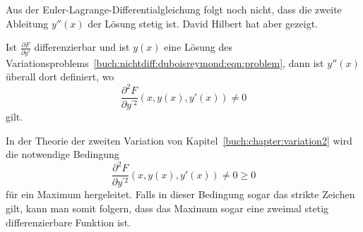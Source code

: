 Aus der Euler-Lagrange-Differentialgleichung folgt noch nicht, dass
die zweite Ableitung $y''(x)$ der Lösung stetig ist.
David Hilbert hat aber gezeigt.

\begin{satz}
Ist $\frac{\partial F}{\partial y'}$ differenzierbar und ist $y(x)$ eine
Lösung des Variationsproblems~\eqref{buch:nichtdiff:duboisreymond:eqn:problem},
dann ist $y''(x)$ überall dort definiert, wo
\[
\frac{\partial^2 F}{\partial y^{\prime 2}}(x,y(x),y'(x)) \ne 0
\]
gilt.
\end{satz}


In der Theorie der zweiten Variation von Kapitel~\ref{buch:chapter:variation2}
wird die notwendige Bedingung
\[
\frac{\partial^2 F}{\partial y^{\prime 2}}(x,y(x),y'(x)) \ne 0
\ge 0
\]
für ein Maximum hergeleitet.
Falls in dieser Bedingung sogar das strikte Zeichen gilt, kann man
somit folgern, dass das Maximum sogar eine zweimal stetig differenzierbare
Funktion ist.




